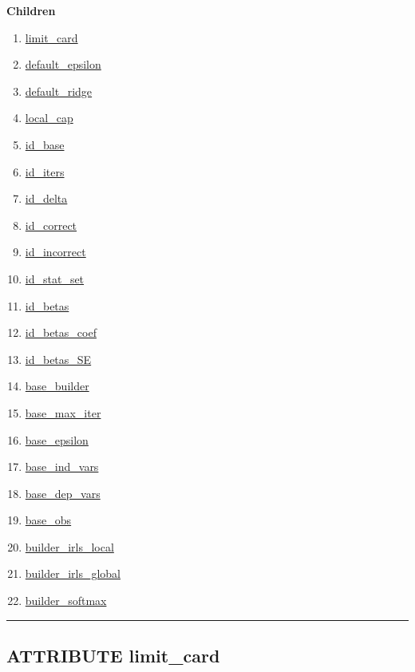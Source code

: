 \par


\textbf{Children}
\begin{enumerate}
\item \hyperlink{ecldoc:constants.limit_card}{limit\_card}
\item \hyperlink{ecldoc:constants.default_epsilon}{default\_epsilon}
\item \hyperlink{ecldoc:constants.default_ridge}{default\_ridge}
\item \hyperlink{ecldoc:constants.local_cap}{local\_cap}
\item \hyperlink{ecldoc:constants.id_base}{id\_base}
\item \hyperlink{ecldoc:constants.id_iters}{id\_iters}
\item \hyperlink{ecldoc:constants.id_delta}{id\_delta}
\item \hyperlink{ecldoc:constants.id_correct}{id\_correct}
\item \hyperlink{ecldoc:constants.id_incorrect}{id\_incorrect}
\item \hyperlink{ecldoc:constants.id_stat_set}{id\_stat\_set}
\item \hyperlink{ecldoc:constants.id_betas}{id\_betas}
\item \hyperlink{ecldoc:constants.id_betas_coef}{id\_betas\_coef}
\item \hyperlink{ecldoc:constants.id_betas_se}{id\_betas\_SE}
\item \hyperlink{ecldoc:constants.base_builder}{base\_builder}
\item \hyperlink{ecldoc:constants.base_max_iter}{base\_max\_iter}
\item \hyperlink{ecldoc:constants.base_epsilon}{base\_epsilon}
\item \hyperlink{ecldoc:constants.base_ind_vars}{base\_ind\_vars}
\item \hyperlink{ecldoc:constants.base_dep_vars}{base\_dep\_vars}
\item \hyperlink{ecldoc:constants.base_obs}{base\_obs}
\item \hyperlink{ecldoc:constants.builder_irls_local}{builder\_irls\_local}
\item \hyperlink{ecldoc:constants.builder_irls_global}{builder\_irls\_global}
\item \hyperlink{ecldoc:constants.builder_softmax}{builder\_softmax}
\end{enumerate}

\rule{\linewidth}{0.5pt}

\subsection*{\textsf{\colorbox{headtoc}{\color{white} ATTRIBUTE}
limit\_card}}

